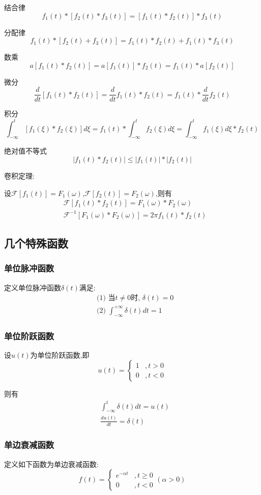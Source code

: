 \documentclass[12pt, a4paper, oneside]{ctexart}
\begin{document}
结合律
\[
    f_1(t) * [f_2(t) * f_3(t)] = [f_1(t) * f_2(t)] * f_3(t)
\]

分配律
\[
    f_1(t) * [f_2(t) + f_3(t)] = f_1(t) * f_2(t) + f_1(t) * f_3(t)
\]

数乘
\[
    a[f_1(t) * f_2(t)] = a[f_1(t)] * f_2(t) = f_1(t) * a[f_2(t)]
\]

微分
\[
    \frac{d}{dt}[f_1(t) * f_2(t)] = \frac{d}{dt}f_1(t) * f_2(t) = f_1(t) * \frac{d}{dt}f_2(t)
\]

积分
\[
    \int_{-\infty}^{t}[f_1(\xi) * f_2(\xi)]d\xi = f_1(t) * \int_{-\infty}^{t}f_2(\xi)d\xi = \int_{-\infty}^{t}f_1(\xi)d\xi * f_2(t)
\]

绝对值不等式
\[
    |f_1(t) * f_2(t)| \le |f_1(t)| * |f_2(t)|
\]

卷积定理:

设$\mathcal{F}[f_1(t)] = F_1(\omega)$,$\mathcal{F}[f_2(t)] = F_2(\omega)$,则有
\begin{align*}
    &\mathcal{F}[f_1(t) * f_2(t)] = F_1(\omega) * F_2(\omega)\\
    &\mathcal{F}^{-1}[F_1(\omega) * F_2(\omega)] = 2\pi f_1(t) * f_2(t)
\end{align*}
\subsection{几个特殊函数}
\subsubsection{单位脉冲函数}
定义单位脉冲函数$\delta(t)$满足:
\begin{align*}
    &\text{(1) 当$t\ne 0$时, }\delta (t) = 0\\
    &\text{(2) }\int_{-\infty}^{+\infty}\delta(t)dt=1
\end{align*}
\subsubsection{单位阶跃函数}
设$u(t)$为单位阶跃函数,即
\[
    u(t) = \begin{cases}
        1 &, t > 0\\
        0 &, t < 0
    \end{cases}
\]

则有
\begin{align*}
    &\int_{-\infty}^{t}\delta(t)dt = u(t)\\
    &\frac{du(t)}{dt} = \delta(t)
\end{align*}
\subsubsection{单边衰减函数}
定义如下函数为单边衰减函数:
\[
    f(t) = \begin{cases}
        e^{-\alpha t} &,t \ge 0\\
        0 &, t < 0
    \end{cases}(\alpha > 0)
\]
\end{document}
